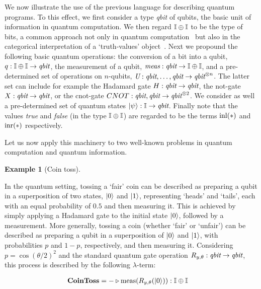 \documentclass[10pt,a4paper]{amsart}
\theoremstyle{definition}
\theoremstyle{definition}
\newtheorem{example}[definition]{Example}
\theoremstyle{definition}
\theoremstyle{definition}
\theoremstyle{definition}
\theoremstyle{definition}
\begin{document}
We now illustrate the use of the previous language for describing quantum
programs. To this effect, we first consider a type \emph{qbit} of qubits, the
basic unit of information in quantum computation. We then regard $\mathbb{I} \oplus
\mathbb{I}$ to be the type of bits, a common approach not only in quantum
computation~\cite{selinger04} but also in the categorical interpretation of a
`truth-values' object~\cite{johnstone02,cho15}. Next we propound the following
basic quantum operations:  the conversion of a bit into a qubit, $q : \mathbb{I}
\oplus \mathbb{I}  \to \emph{qbit}$, the measurement of a qubit,
$\emph{meas}:\emph{qbit} \to \mathbb{I} \oplus \mathbb{I}$, and a pre-determined set of
operations on $n$-qubits, $\emph{U}:\emph{qbit},\ldots,\emph{qbit} \to
\emph{qbit}^{\otimes n}$. The latter set can include for example the Hadamard
gate $H : \emph{qbit} \to \emph{qbit}$, the not-gate $X : \emph{qbit} \to
\emph{qbit}$, or the cnot-gate $CNOT : \emph{qbit},\emph{qbit} \to
\emph{qbit}^{\otimes 2}$. We consider as well a pre-determined set of quantum
states $\ket{\psi} : \mathbb{I} \to \emph{qbit}$.  Finally note that the values
\emph{true} and \emph{false} (in the type $\mathbb{I} \oplus \mathbb{I}$) are regarded to be 
the terms $\mathrm{inl}(\ast)$ and $\mathrm{inr}(\ast)$ respectively.

Let us now apply this machinery to two well-known problems in quantum computation
and quantum information.

\begin{example}[Coin toss]
~
\end{example}

In the quantum setting, tossing a `fair' coin can be described as preparing a qubit in a superposition of two states, $\ket{0}$ and $\ket{1}$, representing `heads' and `tails', each with an equal probability of $0.5$ and then measuring it. This is achieved by simply applying a Hadamard gate to the initial state $\ket{0}$, followed by a measurement.
More generally, tossing a coin (whether `fair' or `unfair') can be described as preparing a qubit in a superposition of  $\ket{0}$ and $\ket{1}$, with probabilities $p$ and $1-p$, respectively,  and then measuring it.  Considering $p= \cos(\theta/2)^2$ and the standard quantum gate operation $R_{y,\theta} : \emph{qbit} \to \emph{qbit}$,  this process is described by the following $\lambda$-term:

\begin{align*}
  &\textbf{CoinToss} = - \triangleright \text{meas} (R_{y,\theta} (\ket{0})): \mathbb{I} \oplus \mathbb{I}
\end{align*}
\end{document}
